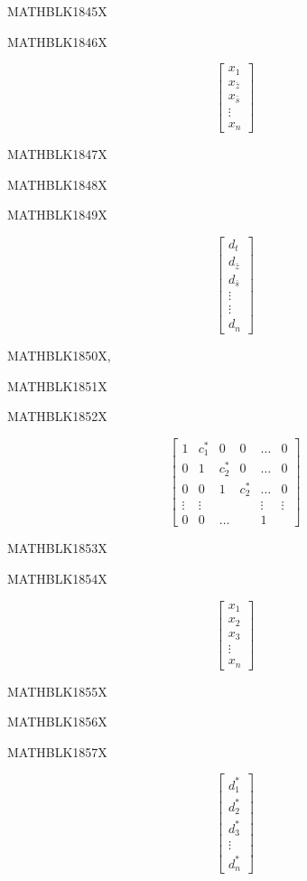 \documentclass[
  ukrainian,
]{article}
\begin{document}
MATHBLK1845X

MATHBLK1846X

\[
\begin{bmatrix} x_1 \\ x_{\bar{z}} \\ x_{\bar{s}} \\ \vdots \\ x_n \end{bmatrix}
\]

MATHBLK1847X

MATHBLK1848X

MATHBLK1849X

\[
\begin{bmatrix} d_t \\ d_{\bar{z}} \\ d_{\bar{s}} \\ \vdots \\ \vdots \\ d_n \end{bmatrix}
\]

MATHBLK1850X,

MATHBLK1851X

MATHBLK1852X

\[
\begin{bmatrix} 1 & c_1^* & 0 & 0 & \dots & 0 \\ 0 & 1 & c_2^* & 0 & \dots & 0 \\ 0 & 0 & 1 & c_2^* & \dots & 0 \\ \vdots & \vdots & & & \vdots & \vdots \\ 0 & 0 & \dots & & 1 \end{bmatrix}
\]

MATHBLK1853X

MATHBLK1854X

\[
\begin{bmatrix} x_1 \\ x_2 \\ x_3 \\ \vdots \\ x_n \end{bmatrix}
\]

MATHBLK1855X

MATHBLK1856X

MATHBLK1857X

\[
\begin{bmatrix} d_1^* \\ d_2^* \\ d_3^* \\ \vdots \\ d_n^* \end{bmatrix}
\]
\end{document}
